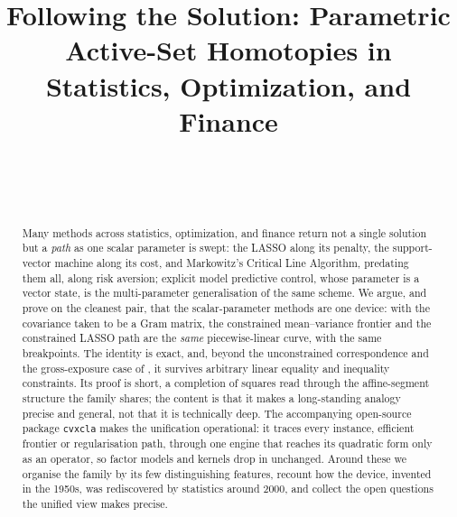 \documentclass[sts]{imsart}
\theoremstyle{plain}
\theoremstyle{definition}
\begin{document}
\setcounter{secnumdepth}{2}

\begin{frontmatter}
\title{Following the Solution: Parametric Active-Set Homotopies in Statistics,
Optimization, and Finance}

\begin{aug}
\author[A]{~}
\author[B]{~}


\address[A]{Department of Statistics, Stanford University, Stanford, California,
USA.}
\address[B]{Jebel Quant Research, Abu Dhabi.}
\end{aug}

\begin{abstract}
Many methods across statistics, optimization, and finance return not a single
solution but a \emph{path} as one scalar parameter is swept: the LASSO along its
penalty, the support-vector machine along its cost, and Markowitz's Critical Line
Algorithm, predating them all, along risk aversion; explicit model predictive
control, whose parameter is a vector state, is the multi-parameter generalisation of
the same scheme. We argue, and prove on the cleanest pair, that the scalar-parameter
methods are one device: with the covariance taken to be a Gram matrix, the constrained
mean--variance frontier and the constrained LASSO path are the \emph{same}
piecewise-linear curve, with the same breakpoints. The identity is exact, and, beyond the
unconstrained correspondence and the gross-exposure case of \citet{brodie2009}, it
survives arbitrary linear equality and inequality constraints. Its proof is short, a
completion of squares read through the affine-segment structure the family shares; the
content is that it makes a long-standing analogy precise and general, not that it is
technically deep. The
accompanying open-source package \texttt{cvxcla} makes the unification operational: it
traces every instance, efficient frontier or regularisation path, through one engine
that reaches its quadratic form only as an operator, so factor models and kernels drop
in unchanged. Around these we organise the family by its few distinguishing features,
recount how the device, invented in the 1950s, was rediscovered by statistics around
2000, and collect the open questions the unified view makes precise.
\end{abstract}


\end{frontmatter}
\end{document}
